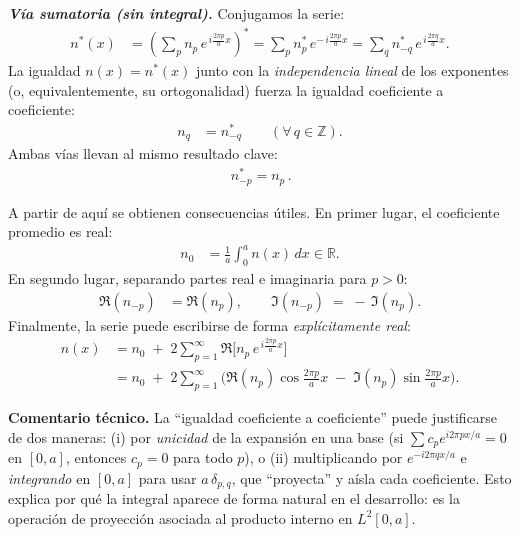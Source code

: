 \documentclass{article}
\begin{document}
\medskip
\textbf{\textit{Vía sumatoria (sin integral).}} Conjugamos la serie:
\begin{equation*}
\begin{split}
n^{*}(x) &= \left(\sum_{p} n_p\,e^{\,i \tfrac{2\pi p}{a}x}\right)^{*}
         = \sum_{p} n_p^{*}\,e^{-\,i \tfrac{2\pi p}{a}x}
         = \sum_{q} n_{-q}^{*}\,e^{\,i \tfrac{2\pi q}{a}x}.
\end{split}
\end{equation*}
La igualdad $n(x)=n^{*}(x)$ junto con la \emph{independencia lineal} de los exponentes (o, equivalentemente, su ortogonalidad) fuerza la igualdad coeficiente a coeficiente:
\begin{equation*}
\begin{split}
n_q &= n_{-q}^{*}\qquad(\forall\,q\in\mathbb{Z}).
\end{split}
\end{equation*}
Ambas vías llevan al mismo resultado clave:
\begin{equation*}
\begin{split}
\boxed{\,n_{-p}^{*}=n_{p}\,}.
\end{split}
\end{equation*}

A partir de aquí se obtienen consecuencias útiles. En primer lugar, el coeficiente promedio es real:
\begin{equation*}
\begin{split}
n_{0} &= \frac{1}{a}\int_{0}^{a} n(x)\,dx \in \mathbb{R}.
\end{split}
\end{equation*}
En segundo lugar, separando partes real e imaginaria para $p>0$:
\begin{equation*}
\begin{split}
\Re(n_{-p}) &= \Re(n_{p}), \qquad \Im(n_{-p}) \;=\; -\,\Im(n_{p}).
\end{split}
\end{equation*}
Finalmente, la serie puede escribirse de forma \emph{explícitamente real}:
\begin{equation*}
\begin{split}
n(x) &= n_{0} \;+\; 2\sum_{p=1}^{\infty}\Re\!\Big[n_{p}\,e^{\,i \tfrac{2\pi p}{a}x}\Big] \\[1mm]
     &= n_{0} \;+\; 2\sum_{p=1}^{\infty}\Big(\Re(n_p)\cos\tfrac{2\pi p}{a}x \;-\; \Im(n_p)\sin\tfrac{2\pi p}{a}x\Big).
\end{split}
\end{equation*}

\textbf{Comentario técnico.} La “igualdad coeficiente a coeficiente” puede justificarse de dos maneras: (i) por \emph{unicidad} de la expansión en una base (si $\sum c_p e^{i 2\pi p x/a}=0$ en $[0,a]$, entonces $c_p=0$ para todo $p$), o (ii) multiplicando por $e^{-i 2\pi q x/a}$ e \emph{integrando} en $[0,a]$ para usar $a\,\delta_{p,q}$, que “proyecta” y aísla cada coeficiente. Esto explica por qué la integral aparece de forma natural en el desarrollo: es la operación de proyección asociada al producto interno en $L^{2}[0,a]$.
\end{document}
